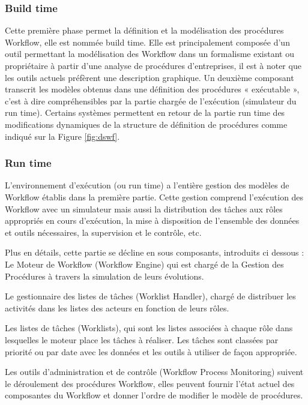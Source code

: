  	 \subsubsection{ Build time }
 	 
 	 Cette première phase permet la définition et la modélisation des procédures Workflow, elle est nommée build time. Elle est principalement composée d’un outil permettant la modélisation des Workflow dans un formalisme existant ou propriétaire à partir d’une analyse de procédures d’entreprises, il est à noter que les outils actuels préfèrent une description graphique. Un deuxième composant transcrit les modèles obtenus dans une définition des procédures « exécutable », c’est à dire compréhensibles par la partie chargée de l’exécution (simulateur du run time). Certains systèmes permettent en retour de la partie run time des modifications dynamiques de la structure de définition de procédures comme indiqué sur la Figure \ref{fig:dswf}. 
 	  	 \subsubsection{ Run time }
 	 L’environnement d’exécution (ou run time) a l’entière gestion des modèles de Workflow établis dans la première partie. Cette gestion comprend l’exécution des Workflow avec un simulateur mais aussi la distribution des tâches aux rôles appropriés en cours d’exécution, la mise à disposition de l’ensemble des données et outils nécessaires, la supervision et le contrôle, etc.
 	 
 	 Plus en détails, cette partie se décline en sous composants, introduits ci dessous : Le Moteur de Workflow (Workflow Engine) qui est chargé de la Gestion des Procédures à travers la simulation de leurs évolutions. 
 	 
 	 Le gestionnaire des listes de tâches (Worklist Handler), chargé de distribuer les activités dans les listes des acteurs en fonction de leurs rôles. 
 	 
 	 Les listes de tâches (Worklists), qui sont les listes associées à chaque rôle dans lesquelles le moteur place les tâches à réaliser. Les tâches sont classées par priorité ou par date avec les données et les outils à utiliser de façon appropriée. 
 	 
 	 
 	 Les outils d’administration et de contrôle (Workflow Process Monitoring) suivent le déroulement des procédures Workflow, elles peuvent fournir l’état actuel des composantes du Workflow et donner l’ordre de modifier le modèle de procédures.
 	 
